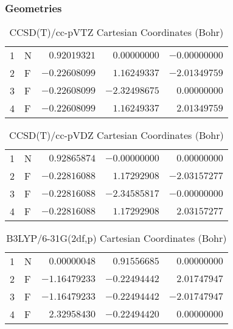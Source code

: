 \documentclass[10pt,oneside]{article}
\begin{document}
\subsubsection*{Geometries}
\begin{table}[h!]
\centering
\caption{CCSD(T)/cc-pVTZ Cartesian Coordinates (Bohr)}
\begin{tabular}{llrrr}
1  & N  & $ 0.92019321$ & $ 0.00000000$ & $-0.00000000$ \\
2  & F  & $-0.22608099$ & $ 1.16249337$ & $-2.01349759$ \\
3  & F  & $-0.22608099$ & $-2.32498675$ & $ 0.00000000$ \\
4  & F  & $-0.22608099$ & $ 1.16249337$ & $ 2.01349759$ \\
\end{tabular}
\end{table}

\begin{table}[h!]
\centering
\caption{CCSD(T)/cc-pVDZ Cartesian Coordinates (Bohr)}
\begin{tabular}{llrrr}
1  & N  & $ 0.92865874$ & $-0.00000000$ & $ 0.00000000$ \\
2  & F  & $-0.22816088$ & $ 1.17292908$ & $-2.03157277$ \\
3  & F  & $-0.22816088$ & $-2.34585817$ & $-0.00000000$ \\
4  & F  & $-0.22816088$ & $ 1.17292908$ & $ 2.03157277$ \\
\end{tabular}
\end{table}

\begin{table}[h!]
\centering
\caption{B3LYP/6-31G(2df,p) Cartesian Coordinates (Bohr)}
\begin{tabular}{llrrr}
1  & N  & $ 0.00000048$ & $ 0.91556685$ & $ 0.00000000$ \\
2  & F  & $-1.16479233$ & $-0.22494442$ & $ 2.01747947$ \\
3  & F  & $-1.16479233$ & $-0.22494442$ & $-2.01747947$ \\
4  & F  & $ 2.32958430$ & $-0.22494420$ & $ 0.00000000$ \\
\end{tabular}
\end{table}

\clearpage
\end{document}
